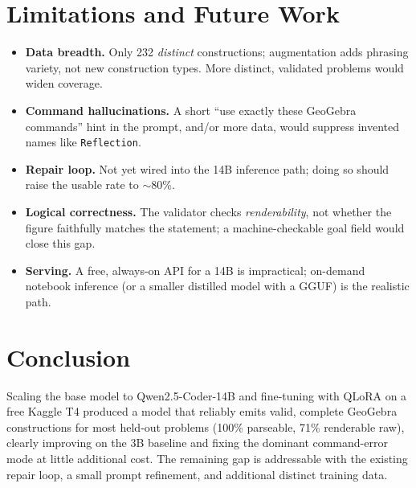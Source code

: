 \documentclass[11pt]{article}
\newcommand{\code}[1]{\texttt{#1}}
\begin{document}
\section{Limitations and Future Work}
\begin{itemize}[noitemsep]
  \item \textbf{Data breadth.} Only 232 \emph{distinct} constructions; augmentation adds phrasing
        variety, not new construction types. More distinct, validated problems would widen coverage.
  \item \textbf{Command hallucinations.} A short ``use exactly these GeoGebra commands'' hint in the
        prompt, and/or more data, would suppress invented names like \code{Reflection}.
  \item \textbf{Repair loop.} Not yet wired into the 14B inference path; doing so should raise the
        usable rate to $\sim$80\%.
  \item \textbf{Logical correctness.} The validator checks \emph{renderability}, not whether the figure
        faithfully matches the statement; a machine-checkable goal field would close this gap.
  \item \textbf{Serving.} A free, always-on API for a 14B is impractical; on-demand notebook
        inference (or a smaller distilled model with a GGUF) is the realistic path.
\end{itemize}

\section{Conclusion}
Scaling the base model to Qwen2.5-Coder-14B and fine-tuning with QLoRA on a free Kaggle T4
produced a model that reliably emits valid, complete GeoGebra constructions for most held-out
problems (100\% parseable, 71\% renderable raw), clearly improving on the 3B baseline and
fixing the dominant command-error mode at little additional cost. The remaining gap is
addressable with the existing repair loop, a small prompt refinement, and additional distinct
training data.
\end{document}
